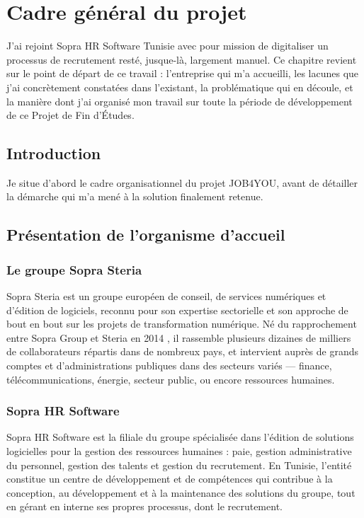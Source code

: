 \chapter{Cadre général du projet}

J’ai rejoint Sopra HR Software Tunisie avec pour mission de digitaliser un processus de recrutement resté, jusque-là, largement manuel. Ce chapitre revient sur le point de départ de ce travail : l’entreprise qui m’a accueilli, les lacunes que j’ai concrètement constatées dans l’existant, la problématique qui en découle, et la manière dont j’ai organisé mon travail sur toute la période de développement de ce Projet de Fin d’Études.

\section{Introduction}
\label{sec_1_1}
Je situe d’abord le cadre organisationnel du projet JOB4YOU, avant de détailler la démarche qui m’a mené à la solution finalement retenue.

\section{Présentation de l’organisme d’accueil}
\label{sec_1_2}
\subsection{Le groupe Sopra Steria}
\label{sec_1_2_1}
Sopra Steria est un groupe européen de conseil, de services numériques et d’édition de logiciels, reconnu pour son expertise sectorielle et son approche de bout en bout sur les projets de transformation numérique. Né du rapprochement entre Sopra Group et Steria en 2014 \cite{ref01}, il rassemble plusieurs dizaines de milliers de collaborateurs répartis dans de nombreux pays, et intervient auprès de grands comptes et d’administrations publiques dans des secteurs variés — finance, télécommunications, énergie, secteur public, ou encore ressources humaines.

\subsection{Sopra HR Software}
\label{sec_1_2_2}
Sopra HR Software est la filiale du groupe spécialisée dans l’édition de solutions logicielles pour la gestion des ressources humaines : paie, gestion administrative du personnel, gestion des talents et gestion du recrutement. En Tunisie, l’entité constitue un centre de développement et de compétences qui contribue à la conception, au développement et à la maintenance des solutions du groupe, tout en gérant en interne ses propres processus, dont le recrutement.

